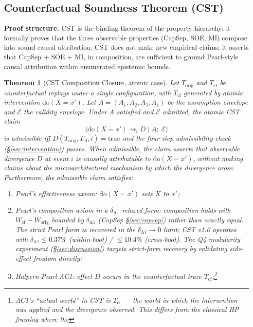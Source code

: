 \documentclass[conference]{IEEEtran}
\newtheorem{theorem}{Theorem}
\newcommand{\Korig}{T_\text{orig}}
\newcommand{\Tcf}{T_\text{cf}}
\newcommand{\dox}[1]{\text{do}(X{=}#1)}
\begin{document}
\subsection{Counterfactual Soundness Theorem (CST)}\label{sec:cst}

\textbf{Proof structure.} CST is the binding theorem of the property
hierarchy: it formally proves that the three observable properties
(CapSep, SOE, MI) compose into sound causal attribution. CST does
not make new empirical claims; it asserts that CapSep + SOE + MI, in
composition, are sufficient to ground Pearl-style causal attribution
within enumerated epistemic bounds.

\begin{theorem}[CST Composition Closure, atomic case]
\label{thm:cst}
Let $\Korig$ and $\Tcf$ be counterfactual replays under a single
configuration, with $\Tcf$ generated by atomic intervention
$\dox{x'}$. Let $A = (A_1, A_2, A_3, A_4)$ be the assumption envelope
and $\mathcal{E}$ the validity envelope. Under $A$ satisfied and
$\mathcal{E}$ admitted, the atomic CST claim
$$\big\langle \dox{x'} \rightsquigarrow_i D \;\big|\;
A;\;\mathcal{E} \big\rangle$$
is \emph{admissible} iff $D(\Korig, \Tcf, i) = \text{true}$ and the
four-step admissibility check (\S\ref{sec:intervention}) passes.
When admissible, the claim asserts that observable divergence $D$ at
event $i$ is causally attributable to $\dox{x'}$, without making
claims about the microarchitectural mechanism by which the
divergence arose. Furthermore, the admissible claim satisfies:
\begin{enumerate}[label=(\roman*)]
\item Pearl's effectiveness axiom: $\dox{x'}$ sets $X$ to $x'$;
\item Pearl's composition axiom in a $\delta_{\text{A1}}$-relaxed
  form: composition holds with $W_\text{cf} - W_\text{orig}$
  bounded by $\delta_{\text{A1}}$ (CapSep \S\ref{sec:capsep}) rather
  than exactly equal. The strict Pearl form is recovered in the
  $\delta_{\text{A1}} \to 0$ limit; CST v1.0 operates with
  $\delta_{\text{A1}} \leq 0.37\%$ (within-boot) /
  $\leq 10.4\%$ (cross-boot). The Q4 modularity experiment
  (\S\ref{sec:discussion}) targets strict-form recovery by
  validating side-effect freedom directly;
\item Halpern-Pearl AC1: effect $D$ occurs in the counterfactual
  trace $\Tcf$;\footnote{AC1's ``actual world'' in CST is $\Tcf$ ---
  the world in which the intervention was applied and the divergence
  observed. This differs from the classical HP framing where the
}
\end{enumerate}
\end{theorem}
\end{document}
